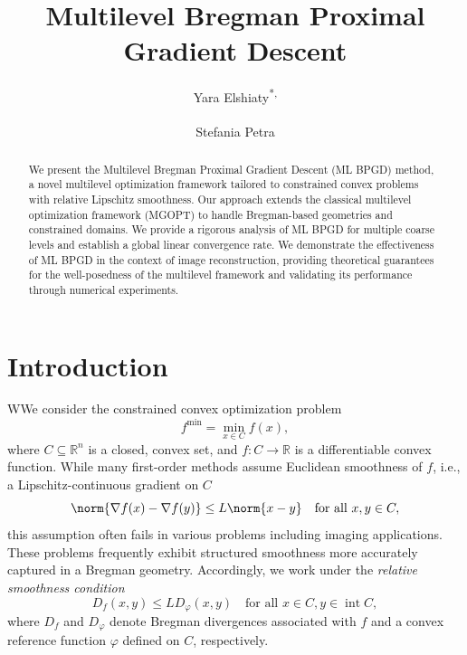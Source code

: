 \documentclass[11pt,reqno]{amsart}
\title[Multilevel Bregman Proximal Gradient Descent]{ Multilevel Bregman Proximal Gradient Descent}
\author{Yara Elshiaty\textsuperscript{*,\ddag} \and Stefania Petra\textsuperscript{\ddag}}
\numberwithin{equation}{section}
\numberwithin{figure}{section}
\theoremstyle{plain}
\theoremstyle{definition}
\newcommand{\R}{\mathbb{R}}
\newcommand{\vphi}{\varphi}
\newcommand{\df}{\nabla f}
\DeclareMathOperator{\intr}{int}
\begin{document}
\begin{abstract}
We present the Multilevel Bregman Proximal Gradient Descent (ML BPGD) method, a novel multilevel optimization framework tailored to constrained convex problems with relative Lipschitz smoothness. Our approach extends the classical multilevel optimization framework (MGOPT) to handle Bregman-based geometries and constrained domains. We provide a rigorous analysis of ML BPGD for multiple coarse levels and establish a global linear convergence rate. We demonstrate the effectiveness of ML BPGD in the context of image reconstruction, providing theoretical guarantees for the well-posedness of the multilevel framework and validating its performance through numerical experiments.
\end{abstract}

\maketitle
{}


\tableofcontents

\section{Introduction}
WWe consider the constrained convex optimization problem  
\begin{equation} \label{eq:main_problem}
    f^{\min} = 
    \min_{x \in C} f(x),
\end{equation}
where $ C \subseteq \R^n$ is a closed, convex set, and $f: C \to \R$ is a differentiable convex function. 
While many first-order methods assume Euclidean smoothness of $f$, i.e., a Lipschitz-continuous gradient on $C$
\begin{equation} \label{eq:Lipschitz-condition}
    \norm{\df(x) - \df(y)} \leq L \norm{x-y}  \quad \text{for all } x,y \in C,
\end{equation}  
this assumption often fails in various problems including imaging applications.
These problems frequently exhibit structured smoothness more accurately captured in a Bregman geometry. Accordingly, we work under the \emph{relative smoothness condition} \cite{Bauschke:2017aa}
\begin{equation}\label{eq:rel-smoothness}
    D_f(x,y) \leq L D_\vphi(x,y) \quad \text{for all } x \in C ,y \in \intr C,
\end{equation}
where $D_f$ and $D_\vphi$ denote Bregman divergences associated with $f$ and a convex reference function $\vphi$ defined on $C$, respectively.
\end{document}
